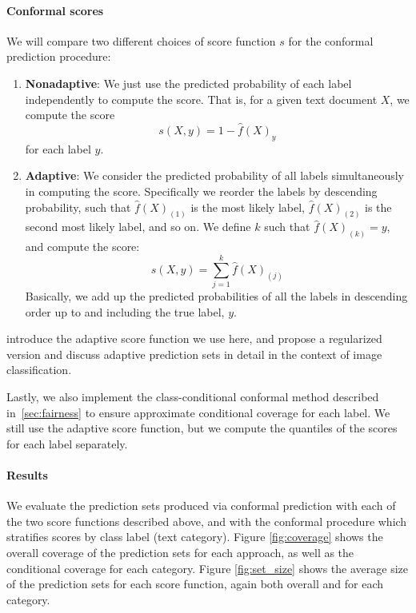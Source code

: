 \documentclass[a4paper, 12pt]{article}
\begin{document}
\paragraph{Conformal scores}
We will compare two different choices of score function $s$ for the conformal prediction procedure:
\begin{enumerate}
    \item \textbf{Nonadaptive}: We just use the predicted probability of each label independently to compute the score. That is, for a given text document $X$, we compute the score \[s(X, y) = 1 - \hat{f}(X)_y \] for each label $y$.
    \item \textbf{Adaptive}: We consider the predicted probability of all labels simultaneously in computing the score. Specifically we reorder the labels by descending probability, such that $\hat{f}(X)_{(1)}$ is the most likely label, $\hat{f}(X)_{(2)}$ is the second most likely label, and so on. We define $k$ such that $\hat{f}(X)_{(k)} = y$, and compute the score: \[ s(X, y) = \sum_{j=1}^{k} \hat{f}(X)_{(j)} \] Basically, we add up the predicted probabilities of all the labels in descending order up to and including the true label, $y$.
\end{enumerate}

\textcite{romanoClassificationValidAdaptive2020} introduce the adaptive score function we use here, and \textcite{angelopoulosUncertaintySetsImage2022} propose a regularized version and discuss adaptive prediction sets in detail in the context of image classification.

Lastly, we also implement the class-conditional conformal method described in~\ref{sec:fairness} to ensure approximate conditional coverage for each label. We still use the adaptive score function, but we compute the quantiles of the scores for each label separately.

\paragraph*{Results} We evaluate the prediction sets produced via conformal prediction with each of the two score functions described above, and with the conformal procedure which stratifies scores by class label (text category). Figure \ref{fig:coverage} shows the overall coverage of the prediction sets for each approach, as well as the conditional coverage for each category. Figure \ref{fig:set_size} shows the average size of the prediction sets for each score function, again both overall and for each category.
\end{document}
